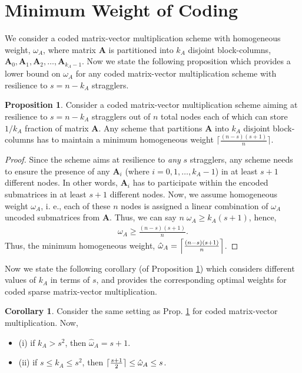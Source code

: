 \documentclass[conference]{IEEEtran}
\DeclarePairedDelimiter{\ceil}{\lceil}{\rceil}
\theoremstyle{definition}
\newtheorem{proposition}{Proposition}
\newtheorem{corollary}{Corollary}
\newcommand{\bfA}{\mathbf{A}}
\begin{document}
\section{Minimum Weight of Coding}
\label{sec:opt_weight}
We consider a coded matrix-vector multiplication scheme with homogeneous weight, $\omega_A$, where matrix $\bfA$ is partitioned into $k_A$ disjoint block-columns, $\bfA_0, \bfA_1, \bfA_2, \dots, \bfA_{k_A - 1}$. Now we state the following proposition which provides a lower bound on $\omega_A$ for any coded matrix-vector multiplication scheme with resilience to $s = n - k_A$ stragglers.

\begin{proposition}
\label{prop:lowerbound}
Consider a coded matrix-vector multiplication scheme aiming at resilience to $s = n - k_A$ stragglers out of $n$ total nodes each of which can store $1/k_A$ fraction of matrix $\bfA$. Any scheme that partitions $\bfA$ into $k_A$ disjoint block-columns has to maintain a minimum homogeneous weight $\lceil{\frac{(n-s)(s+1)}{n}}\rceil$.
\end{proposition}
\begin{proof}
Since the scheme aims at resilience to {\it any} $s$ stragglers, any scheme needs to ensure the presence of any $\bfA_i$ (where $i = 0, 1, \dots, k_A - 1$) in at least $s+1$ different nodes. In other words, $\bfA_i$ has to participate within the encoded submatrices in at least $s+1$ different nodes. Now, we assume homogeneous weight $\omega_A$, i. e., each of these $n$ nodes is assigned a linear combination of $\omega_A$ uncoded submatrices from $\bfA$. Thus, we can say $n \; \omega_A \geq k_A (s+1)$, hence,
\begin{align*}
\omega_A \geq {\frac{(n-s)(s+1)}{n}}.
\end{align*} Thus, the minimum homogeneous weight, $\hat{\omega}_A = \Bigl\lceil{\frac{(n-s)(s+1)}{n}}\Bigr\rceil$.
\end{proof}

Now we state the following corollary (of Proposition \ref{prop:lowerbound}) which considers different values of $k_A$ in terms of $s$, and provides the corresponding optimal weights for coded sparse matrix-vector multiplication.

\begin{corollary} 
\label{cor:lowerbounds}
Consider the same setting as Prop. \ref{prop:lowerbound} for coded matrix-vector multiplication. Now, 
\begin{itemize}
    \item (i) if $k_A > s^2$, then $\hat{\omega}_A = s + 1$.
    \item (ii) if $s \leq k_A \leq s^2$, then $\ceil{\frac{s+1}{2}} \leq \hat{\omega}_A \leq s$.
\end{itemize}
\end{corollary}
\end{document}
